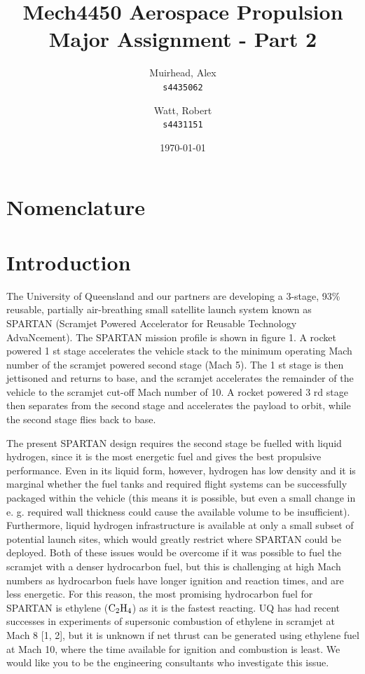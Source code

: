 \documentclass[a4paper]{article}
\title{
	\Large {\sc Mech}4450 Aerospace Propulsion \\
	\Huge Major Assignment - Part 2
}
\author{
	Muirhead, Alex \\ \texttt{s4435062}
	\and
	Watt, Robert \\ \texttt{s4431151}
}
\date{\today}
\begin{document}
\maketitle


\vspace{10em}

\newpage


\section*{Nomenclature}


\newpage
{}

\section{Introduction}
The University of Queensland and our partners are developing a 3-stage, 93\% reusable, partially air-breathing small satellite launch system known as SPARTAN (Scramjet Powered Accelerator for Reusable Technology AdvaNcement). The SPARTAN mission profile is shown in figure 1. A rocket powered 1 st stage accelerates the vehicle stack to the minimum operating Mach number of the scramjet powered second stage (Mach 5). The 1 st
stage is then jettisoned and returns to base, and the scramjet accelerates the remainder of the vehicle to the scramjet cut-off Mach number of 10. A rocket powered 3 rd stage then separates from the second stage and accelerates the payload to orbit, while the second stage flies back to base.

The present SPARTAN design requires the second stage be fuelled with liquid hydrogen, since it is the most energetic fuel and gives the best propulsive performance. Even in its liquid form, however, hydrogen has low density and it is marginal whether the fuel tanks and required flight systems can be successfully packaged within the vehicle (this means it is possible, but even a small change in e. g. required wall thickness could cause the available volume to be insufficient). Furthermore, liquid hydrogen infrastructure is available at only a small subset of potential launch sites, which would greatly restrict where SPARTAN could be deployed. Both of these issues would be overcome if it was possible to fuel the scramjet with a denser hydrocarbon fuel, but this is challenging at high Mach numbers as hydrocarbon fuels have longer ignition and reaction times, and are less energetic. For this reason, the most promising hydrocarbon fuel for SPARTAN is ethylene (\(\ce{C2H4}\)) as it is the fastest reacting. UQ has had recent successes in experiments of supersonic combustion of ethylene in scramjet at Mach 8 [1, 2], but it is unknown if net thrust can be generated using ethylene fuel at Mach 10, where the time available for ignition and combustion is least. We would like you to be the engineering consultants who investigate this issue.
\end{document}

